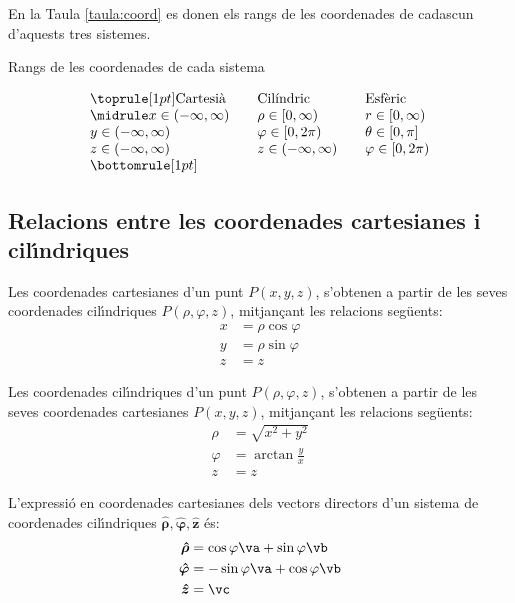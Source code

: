 \documentclass[catalan,a4paper,twoside,11pt]{article}
\begin{document}
En la Taula \vref{taula:coord} es donen els rangs de les coordenades de cadascun d'aquests tres sistemes.
\begin{table}[htb]
   \caption{\label{taula:coord}Rangs de les coordenades de cada sistema}
   \[ \begin{array}{lllll}
   \toprule[1pt]
   \text{Cartesi\`{a}} &  & \text{Cil\'{\i}ndric} & & \text{Esf\`{e}ric}
   \\
   \midrule
      x\in(-\infty,\infty) &   & \rho\in[0,\infty)    &  &  r\in[0,\infty)  \\
      y\in(-\infty,\infty) &   & \varphi\in[0,2\pi)   &  &  \theta\in[0,\pi] \\
      z\in(-\infty,\infty) &   & z\in(-\infty,\infty) &  &  \varphi\in[0,2\pi) \\
   \bottomrule[1pt]
   \end{array}   \]
\end{table}

\subsection{Relacions entre les coordenades cartesianes i
cil\'{\i}ndriques}

Les coordenades cartesianes  d'un punt $P(x,y,z)$, s'obtenen a partir
de les seves coordenades cil\'{\i}ndriques $P(\rho,\varphi,z)$,
mitjan\c{c}ant les relacions seg\"{u}ents:
\begin{subequations}\begin{align}
    x &=\rho\cos\varphi \\ y &=\rho\sin\varphi \\ z &=z
\end{align}\end{subequations}

Les coordenades  cil\'{\i}ndriques  d'un punt $P(\rho,\varphi,z)$,
s'obtenen a partir de les seves coordenades cartesianes $P(x,y,z)$,
mitjan\c{c}ant les relacions seg\"{u}ents:
\begin{subequations}\begin{align}
    \rho &= \sqrt{x^2+y^2}\\
    \varphi &=  \arctan\frac{y}{x}\\
    z &= z
\end{align}\end{subequations}

L'expressi\'{o} en coordenades cartesianes dels vectors directors d'un sistema de coordenades  cil\'{\i}ndriques $\boldsymbol{\hat{\rho}},\boldsymbol{\hat{\varphi}},\boldsymbol{\hat{z}}$ \'{e}s:
\begin{subequations}\begin{align}
    \boldsymbol{\hat{\rho}} &=\cos\varphi\va+\sin\varphi\vb \\
    \boldsymbol{\hat{\varphi}} &=-\sin\varphi\va+\cos\varphi\vb \\
    \boldsymbol{\hat{z}} &=\vc
\end{align}\end{subequations}
\end{document}
